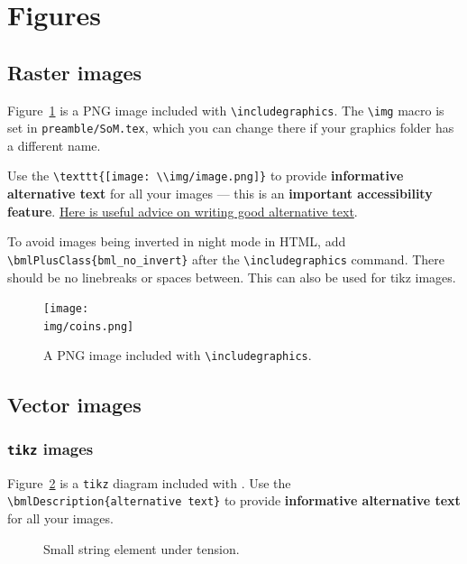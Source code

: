 \section{Figures}
\label{demo:fig}

\subsection{Raster images}
\label{demo:fig:raster}

Figure~\ref{fig:coins} is a PNG image included with \verb|\includegraphics|. The \verb|\img| macro is set in \verb|preamble/SoM.tex|, which you can change there if your graphics folder has a different name.

Use the \verb|\texttt{[image: \\img/image.png]}| to provide \textbf{informative alternative text} for all your images --- this is an \textbf{important accessibility feature}. \href{https://accessibility.huit.harvard.edu/describe-content-images}{Here is useful advice on writing good alternative text}.

To avoid images being inverted in night mode in HTML, add \verb|\bmlPlusClass{bml_no_invert}| after the \verb|\includegraphics| command. There should be no linebreaks or spaces between. This can also be used for tikz images.

\begin{figure}[H]
    \centering
    \texttt{[image: \\img/coins.png]}
    \caption{A PNG image included with \texttt{\textbackslash includegraphics}.}
    \label{fig:coins}
\end{figure}


\subsection{Vector images}
\subsubsection{\texttt{tikz} images}
\label{demo:fig:tikz}

Figure~\ref{fig:string} is a \verb|tikz| diagram included with \verb||.
Use the \verb|\bmlDescription{alternative text}| to provide \textbf{informative alternative text} for all your images.

\begin{figure}[H]
    \centering
    \caption{Small string element under tension.}
    \label{fig:string}
\end{figure}


